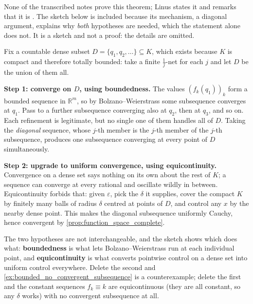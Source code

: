 \begin{ainote}
None of the transcribed notes prove this theorem; Linus states it and remarks that it is
. The sketch below is included because its mechanism, a
diagonal argument, explains why \emph{both} hypotheses are needed, which the statement alone does
not. It is a sketch and not a proof: the details are omitted.
\end{ainote}

\begin{remark}
\label{rem:ascoli_diagonal_sketch}
Fix a countable dense subset $D = \{q_1,q_2,\dots\} \subseteq K$, which exists because $K$ is
compact and therefore totally bounded: take a finite $\tfrac1j$-net for each $j$ and let $D$ be
the union of them all.

\textbf{Step 1: converge on $D$, using boundedness.} The values $(f_k(q_1))_k$ form a bounded
sequence in $\mathbb{R}^m$, so by Bolzano--Weierstrass some subsequence converges at $q_1$. Pass
to a further subsequence converging also at $q_2$, then at $q_3$, and so on. Each refinement is
legitimate, but no single one of them handles all of $D$. Taking the \emph{diagonal} sequence,
whose $j$-th member is the $j$-th member of the $j$-th subsequence, produces one subsequence
converging at every point of $D$ simultaneously.

\textbf{Step 2: upgrade to uniform convergence, using equicontinuity.} Convergence on a dense
set says nothing on its own about the rest of $K$; a sequence can converge at every rational and
oscillate wildly in between. Equicontinuity forbids that: given $\varepsilon$, pick the $\delta$
it supplies, cover the compact $K$ by finitely many balls of radius $\delta$ centred at points
of $D$, and control any $x$ by the nearby dense point. This makes the diagonal subsequence
uniformly Cauchy, hence convergent by \cref{prop:function_space_complete}.
\end{remark}

\begin{remark}
The two hypotheses are not interchangeable, and the sketch shows which does what:
\textbf{boundedness} is what lets Bolzano--Weierstrass run at each individual point, and
\textbf{equicontinuity} is what converts pointwise control on a dense set into uniform control
everywhere. Delete the second and \cref{ex:bounded_no_convergent_subsequence} is a
counterexample; delete the first and the constant sequences $f_k \equiv k$ are equicontinuous
(they are all constant, so any $\delta$ works) with no convergent subsequence at all.
\end{remark}

